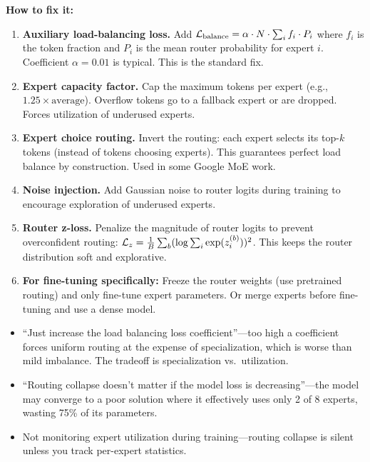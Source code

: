 \begin{interviewq}
\textbf{How to fix it:}
\begin{enumerate}
    \item \textbf{Auxiliary load-balancing loss.} Add $\mathcal{L}_{\text{balance}} = \alpha \cdot N \cdot \sum_i f_i \cdot P_i$ where $f_i$ is the token fraction and $P_i$ is the mean router probability for expert $i$. Coefficient $\alpha = 0.01$ is typical. This is the standard fix.
    \item \textbf{Expert capacity factor.} Cap the maximum tokens per expert (e.g., $1.25 \times \text{average}$). Overflow tokens go to a fallback expert or are dropped. Forces utilization of underused experts.
    \item \textbf{Expert choice routing.} Invert the routing: each expert selects its top-$k$ tokens (instead of tokens choosing experts). This guarantees perfect load balance by construction. Used in some Google MoE work.
    \item \textbf{Noise injection.} Add Gaussian noise to router logits during training to encourage exploration of underused experts.
    \item \textbf{Router z-loss.} Penalize the magnitude of router logits to prevent overconfident routing: $\mathcal{L}_z = \frac{1}{B} \sum_b (\log \sum_i \exp(z_i^{(b)}))^2$. This keeps the router distribution soft and explorative.
    \item \textbf{For fine-tuning specifically:} Freeze the router weights (use pretrained routing) and only fine-tune expert parameters. Or merge experts before fine-tuning and use a dense model.
\end{enumerate}

\redflags
\begin{itemize}
    \item ``Just increase the load balancing loss coefficient''---too high a coefficient forces uniform routing at the expense of specialization, which is worse than mild imbalance. The tradeoff is specialization vs.\ utilization.
    \item ``Routing collapse doesn't matter if the model loss is decreasing''---the model may converge to a poor solution where it effectively uses only 2 of 8 experts, wasting 75\% of its parameters.
    \item Not monitoring expert utilization during training---routing collapse is silent unless you track per-expert statistics.
\end{itemize}



\end{interviewq}
